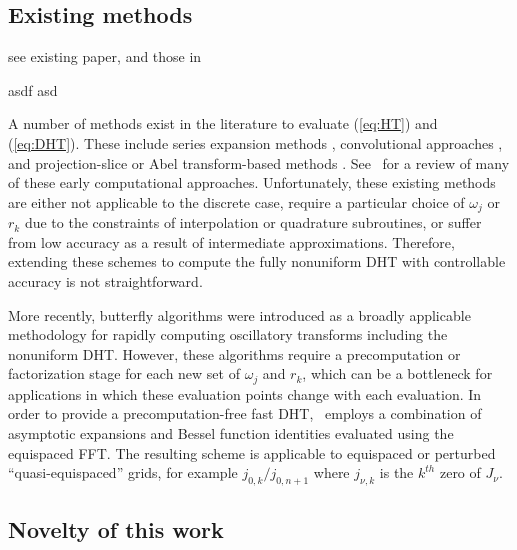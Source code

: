 \subsection*{Existing methods}

see existing paper, and those in

asdf
asd



A number of methods exist in the literature to evaluate (\ref{eq:HT}) and
(\ref{eq:DHT}). These include series expansion methods
\cite{lord1954b,brunol1977fourier,cavanagh1979numerical},
convolutional approaches \cite{siegman1977quasi, johansen1979fast,
mook1983algorithm, liu1999nonuniform}, and projection-slice or Abel transform-based methods
\cite{oppenheim1980computation, hansen1985fast, kapur1995algorithm}.
See~\cite{cree1993algorithms} for a review of many of these early computational
approaches. Unfortunately, these existing methods are either not applicable to
the discrete case, require a particular choice of $\omega_j$ or $r_k$ due to the
constraints of interpolation or quadrature subroutines, or suffer from low
accuracy as a result of intermediate approximations. Therefore, extending these
schemes to compute the fully nonuniform DHT with controllable accuracy is not
straightforward.

More recently, butterfly algorithms \cite{oneil2010algorithm, li2015butterfly,
  pang2020interpolative} were introduced as a broadly applicable methodology for
rapidly computing oscillatory transforms including the nonuniform DHT. However,
these algorithms require a precomputation or factorization stage for each new
set of $\omega_j$ and $r_k$, which can be a bottleneck for applications in which
these evaluation points change with each evaluation. In order to provide a
precomputation-free fast DHT,~\cite{townsend2015fast} employs a combination of
asymptotic expansions and Bessel function identities evaluated using the
equispaced FFT. The resulting scheme is applicable to equispaced or perturbed
``quasi-equispaced'' grids, for example $j_{0,k} / j_{0,n+1}$ where $j_{\nu,k}$
is the $k^{th}$ zero of $J_\nu$.


\subsection*{Novelty of this work}


